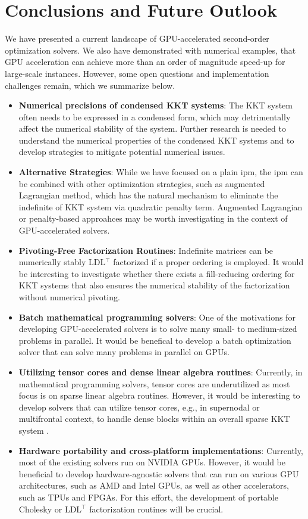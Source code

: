 \documentclass{article}
\begin{document}
\section{Conclusions and Future Outlook}\label{eqn:conclusion}
We have presented a current landscape of GPU-accelerated second-order optimization solvers.
We also have demonstrated with numerical examples, that GPU acceleration can achieve more than an order of magnitude speed-up for large-scale instances.
However, some open questions and implementation challenges remain, which we summarize below.
\begin{itemize}[leftmargin=*,itemsep=0pt,parsep=0pt,partopsep=0pt]
\item \textbf{Numerical precisions of condensed KKT systems}: The KKT system often needs to be expressed in a condensed form, which may detrimentally affect the numerical stability of the system. Further research is needed to understand the numerical properties of the condensed KKT systems and to develop strategies to mitigate potential numerical issues.
\item \textbf{Alternative Strategies}: While we have focused on a plain \gls*{ipm}, the \gls*{ipm} can be combined with other optimization strategies, such as augmented Lagrangian method, which has the natural mechanism to eliminate the indefinite of KKT system via quadratic penalty term. Augmented Lagrangian or penalty-based approahces may be worth investigating in the context of GPU-accelerated solvers.
\item \textbf{Pivoting-Free Factorization Routines}: Indefinite matrices can be numerically stably LDL$^\top$ factorized if a proper ordering is employed. It would be interesting to investigate whether there exists a fill-reducing ordering for KKT systems that also ensures the numerical stability of the factorization without numerical pivoting.
\item \textbf{Batch mathematical programming solvers}: One of the motivations for developing GPU-accelerated solvers is to solve many small- to medium-sized problems in parallel. It would be benefical to develop a batch optimization solver that can solve many problems in parallel on GPUs.
\item \textbf{Utilizing tensor cores and dense linear algebra routines}: Currently, in mathematical programming solvers, tensor cores are underutilized as most focus is on sparse linear algebra routines. However, it would be interesting to develop solvers that can utilize tensor cores, e.g., in supernodal or multifrontal context, to handle dense blocks within an overall sparse KKT system .
\item \textbf{Hardware portability and cross-platform implementations}: Currently, most of the existing solvers run on NVIDIA GPUs. However, it would be beneficial to develop hardware-agnostic solvers that can run on various GPU architectures, such as AMD and Intel GPUs, as well as other accelerators, such as TPUs and FPGAs. For this effort, the development of portable Cholesky or LDL$^\top$ factorization routines will be crucial.
\end{itemize}
\end{document}
